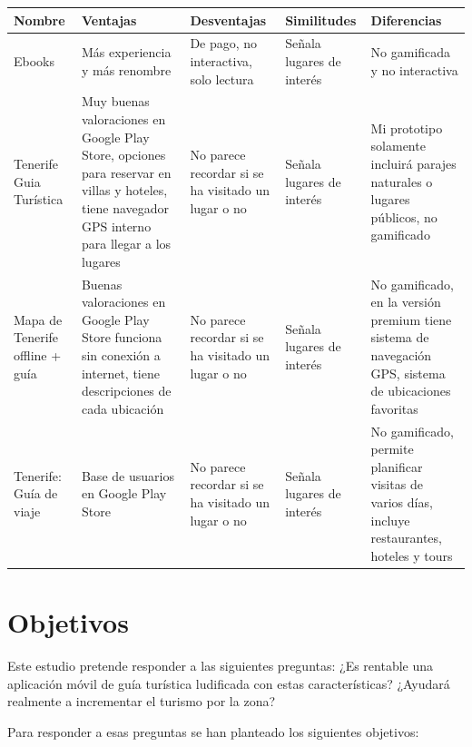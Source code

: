 \begin{ThreePartTable}
\label{table:competencia}

\begin{tabularx}{0.9\textwidth} { 
  | >{\centering\arraybackslash}X 
  | >{\centering\arraybackslash}X
  | >{\centering\arraybackslash}X
  | >{\centering\arraybackslash}X
  | >{\centering\arraybackslash}X | }
 \hline
 Nombre & Ventajas & Desventajas & Similitudes & Diferencias\\
 \hline\hline
 Ebooks & Más experiencia y más renombre & De pago, no interactiva, solo lectura & Señala lugares de interés & No gamificada y no interactiva\\
\hline
Tenerife Guia Turística & Muy buenas valoraciones en Google Play Store, opciones para reservar en villas y hoteles, tiene navegador GPS interno para llegar a los lugares & No parece recordar si se ha visitado un lugar o no & Señala lugares de interés & Mi prototipo solamente incluirá parajes naturales o lugares públicos, no gamificado\\
\hline
Mapa de Tenerife offline + guía & Buenas valoraciones en Google Play Store funciona sin conexión a internet, tiene descripciones de cada ubicación & No parece recordar si se ha visitado un lugar o no & Señala lugares de interés & No gamificado, en la versión premium tiene sistema de navegación GPS, sistema de ubicaciones favoritas \\
\hline
Tenerife: Guía de viaje & Base de usuarios en Google Play Store & No parece recordar si se ha visitado un lugar o no & Señala lugares de interés & No gamificado, permite planificar visitas de varios días, incluye restaurantes, hoteles y tours \\
\hline
\end{tabularx}

\end{ThreePartTable}
\section{Objetivos}
Este estudio pretende responder a las siguientes preguntas: ¿Es rentable una aplicación móvil de guía turística ludificada con estas características? ¿Ayudará realmente a incrementar el turismo por la zona?

Para responder a esas preguntas se han planteado los siguientes objetivos:

